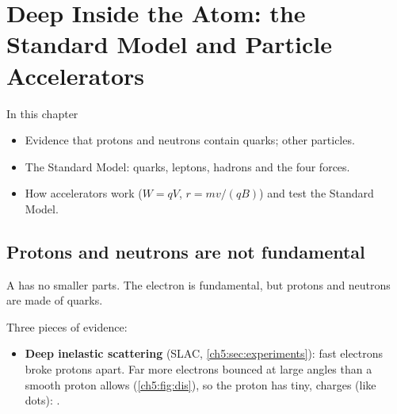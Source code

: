 \chapter[Deep Inside the Atom]{Deep Inside the Atom: the Standard Model and Particle Accelerators}\label{ch5:chap}

\newcommand\chFiveaq[1]{\ensuremath{\overline{\mathrm{#1}}}} %
\newcommand\chFiveperc{\ensuremath{/c^2}}                     %
\newcommand\chFiveanu{\ensuremath{\overline{\nu}_\mathrm{e}}} %

\begin{summarybox}{In this chapter}
\begin{itemize}
  \item Evidence that protons and neutrons contain quarks; other particles.
  \item The Standard Model: quarks, leptons, hadrons and the four forces.
  \item How accelerators work ($W = qV$, $r = mv/(qB)$) and test the Standard Model.
\end{itemize}
\end{summarybox}

\section{Protons and neutrons are not fundamental}\label{ch5:sec:evidence}

\begin{bigidea}
A  has no smaller parts. The electron is fundamental, but
protons and neutrons are made of quarks.
\end{bigidea}

Three pieces of evidence:
\begin{itemize}
  \item \textbf{Deep inelastic scattering} (SLAC, \cref{ch5:sec:experiments}): fast
        electrons broke protons apart. Far more electrons bounced at large angles than a
        smooth proton allows (\cref{ch5:fig:dis}), so the proton has tiny, 
        charges (like dots): .
\end{itemize}


